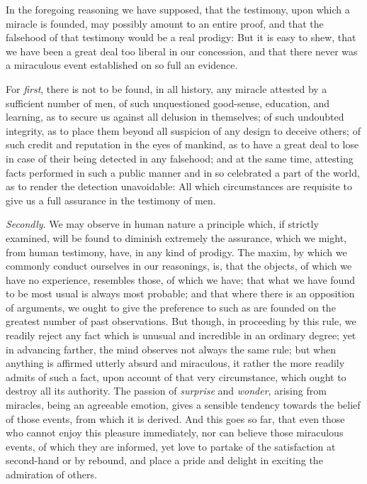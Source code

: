 \documentclass[]{article}
\begin{document}
\begin{sectionbody}

\humeparagraph  In the foregoing reasoning we have supposed, that the testimony, upon which a miracle is founded, may possibly amount to an entire proof, and that the falsehood of that testimony would be a real prodigy: But it is easy to shew, that we have been a great deal too liberal in our concession, and that there never was a miraculous event established on so full an evidence.

\humeparagraph  For \emph{first}, there is not to be found, in all history, any miracle attested by a sufficient number of men, of such unquestioned good-sense, education, and learning, as to secure us against all delusion in themselves; of such undoubted integrity, as to place them beyond all suspicion of any design to deceive others; of such credit and reputation in the eyes of mankind, as to have a great deal to lose in case of their being detected in any falsehood; and at the same time, attesting facts performed in such a public manner and in so celebrated a part of the world, as to render the detection unavoidable: All which circumstances are requisite to give us a full assurance in the testimony of men.

\humeparagraph  \emph{Secondly}. We may observe in human nature a principle which, if strictly examined, will be found to diminish extremely the assurance, which we might, from human testimony, have, in any kind of prodigy. The maxim, by which we commonly conduct ourselves in our reasonings, is, that the objects, of which we have no experience, resembles those, of which we have; that what we have found to be most usual is always most probable; and that where there is an opposition of arguments, we ought to give the preference to such as are founded on the greatest number of past observations. But though, in proceeding by this rule, we readily reject any fact which is unusual and incredible in an ordinary degree; yet in advancing farther, the mind observes not always the same rule; but when anything is affirmed utterly absurd and miraculous, it rather the more readily admits of such a fact, upon account of that very circumstance, which ought to destroy all its authority. The passion of \emph{surprise} and \emph{wonder}, arising from miracles, being an agreeable emotion, gives a sensible tendency towards the belief of those events, from which it is derived. And this goes so far, that even those who cannot enjoy this pleasure immediately, nor can believe those miraculous events, of which they are informed, yet love to partake of the satisfaction at second-hand or by rebound, and place a pride and delight in exciting the admiration of others.


\end{sectionbody}
\end{document}
